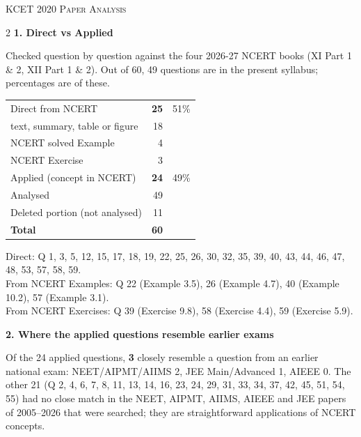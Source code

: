 \clearpage
\begin{center}{}\par
{\fontsize{20}{24}\selectfont\color{navy}\scshape KCET 2020 \textperiodcentered{} Paper Analysis}\par
{\color{gilt}}\end{center}
\vspace{4pt}
\begin{multicols}{2}
\textbf{\color{crimson}1. Direct vs Applied}\par\smallskip
{\footnotesize Checked question by question against the four 2026-27 NCERT books (XI Part 1 \& 2, XII Part 1 \& 2). Out of 60, 49 questions are in the present syllabus; percentages are of these.}\par\smallskip
\begin{tabular}{@{}lrr@{}}\toprule
Direct from NCERT & \textbf{25} & 51\%\\
\quad text, summary, table or figure & 18 &\\
\quad NCERT solved Example & 4 &\\
\quad NCERT Exercise & 3 &\\
Applied (concept in NCERT) & \textbf{24} & 49\%\\\midrule
Analysed & 49 &\\
Deleted portion (not analysed) & 11 &\\\midrule
\textbf{Total} & \textbf{60} &\\\bottomrule\end{tabular}\par\smallskip
{\footnotesize Direct: Q 1, 3, 5, 12, 15, 17, 18, 19, 22, 25, 26, 30, 32, 35, 39, 40, 43, 44, 46, 47, 48, 53, 57, 58, 59.\\ From NCERT Examples: Q 22 (Example 3.5), 26 (Example 4.7), 40 (Example 10.2), 57 (Example 3.1).\\ From NCERT Exercises: Q 39 (Exercise 9.8), 58 (Exercise 4.4), 59 (Exercise 5.9).}\par\medskip
\textbf{\color{crimson}2. Where the applied questions resemble earlier exams}\par\smallskip
Of the 24 applied questions, \textbf{3} closely resemble a question from an earlier national exam:
NEET/AIPMT/AIIMS 2, JEE Main/Advanced 1, AIEEE 0. The other 21 (Q 2, 4, 6, 7, 8, 11, 13, 14, 16, 23, 24, 29, 31, 33, 34, 37, 42, 45, 51, 54, 55) had no close match in the NEET, AIPMT, AIIMS, AIEEE and JEE papers of 2005--2026 that were searched; they are straightforward applications of NCERT concepts.\par

\end{multicols}
